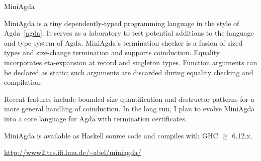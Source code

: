 \begin{hcarentry}{MiniAgda}
\makeheader

MiniAgda is a tiny dependently-typed programming language in the style
of Agda~\cref{agda}. It serves as a laboratory to test 
potential additions to the
language and type system of Agda. MiniAgda's termination checker is a
fusion of sized types and size-change termination and supports
coinduction. Equality incorporates eta-expansion at record and
singleton types. Function arguments can be declared as static; such
arguments are discarded during equality checking and compilation.

Recent features include bounded size quantification and destructor
patterns for a more general handling of coinduction.  In the long
run, I plan to evolve MiniAgda into a core language for Agda with
termination certificates.

MiniAgda is available as Haskell source code and compiles with GHC
$\geq$ 6.12.x. 

\FurtherReading
  \url{http://www2.tcs.ifi.lmu.de/\~abel/miniagda/}
\end{hcarentry}
